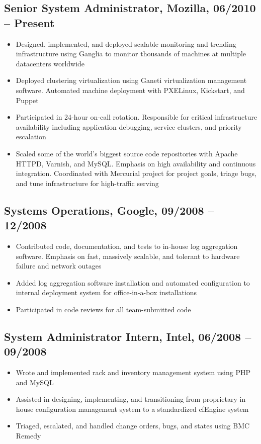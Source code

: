 \documentclass[a4paper,12pt]{report}
\begin{document}
\subsection*{Senior System Administrator, Mozilla, 06/2010 -- Present}
\begin{itemize} \itemsep -0.25em
\item Designed, implemented, and deployed scalable monitoring and trending infrastructure using Ganglia to monitor thousands of machines at multiple datacenters worldwide
\item Deployed clustering virtualization using Ganeti virtualization management software. Automated machine deployment with PXELinux, Kickstart, and Puppet
\item Participated in 24-hour on-call rotation. Responsible for critical infrastructure availability including application debugging, service clusters, and priority escalation
\item Scaled some of the world's biggest source code repositories with Apache HTTPD, Varnish, and MySQL. Emphasis on high availability and continuous integration. Coordinated with Mercurial project for project goals, triage bugs, and tune infrastructure for high-traffic serving
\end{itemize}

\subsection*{Systems Operations, Google, 09/2008 -- 12/2008}
\begin{itemize} \itemsep -0.25em
\item Contributed code, documentation, and tests to in-house log aggregation software. Emphasis on fast, massively scalable, and tolerant to hardware failure and network outages
\item Added log aggregation software installation and automated configuration to internal deployment system for office-in-a-box installations
\item Participated in code reviews for all team-submitted code
\end{itemize}

\subsection*{System Administrator Intern, Intel, 06/2008 -- 09/2008}
\begin{itemize} \itemsep -0.25em
\item Wrote and implemented rack and inventory management system using PHP and MySQL
\item Assisted in designing, implementing, and transitioning from proprietary in-house configuration management system to a standardized cfEngine system
\item Triaged, escalated, and handled change orders, bugs, and states using BMC Remedy
\end{itemize}
\end{document}
